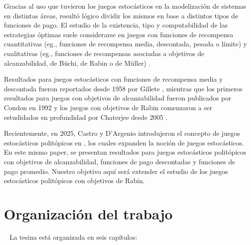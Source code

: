 
Gracias al uso que tuvieron los juegos estocásticos en la modelización de
sistemas en distintas áreas, resultó lógico dividir los mismos en base a
distintos tipos de funciones de pago. El estudio de la existencia, tipo y
computabilidad de las estrategias óptimas suele considerarse en juegos con
funciones de recompensa cuantitativas (eg., funciones de recompensa media,
descontada, pesada o límite) y cualitativas (eg., funciones de recompensas
asociadas a objetivos de alcanzabilidad, de Büchi, de Rabin o de Müller)
\cite{Chatterjee2007,Kučera2011,Chatterjee1}.

Resultados para juegos estocásticos con funciones de recompensa media y
descontada fueron reportados desde 1958 por Gillete \cite{Gillette1958},
mientras que los primeros resultados para juegos con objetivos de
alcanzabilidad fueron publicados por Condon en 1992 \cite{CONDON1992} y los
juegos con objetivos de Rabin comenzaron a ser estudidados en profundidad por
Chaterjee desde 2005 \cite{ComplexityRabin,Chatterjee2007,Chatterjee1}.

Recientemente, en 2025, Castro y D'Argenio introdujeron el concepto de juegos
estocásticos politópicos en \cite{Polytopal}, los cuales expanden la noción de
juegos estocásticos.
En este mismo paper, se presentan resultados para juegos estocásticos
politópicos con objetivos de alcanzabilidad, funciones de pago descontadas y
funciones de pago promedio. Nuestro objetivo aquí será extender el estudio de
los juegos estocásticos politópicos con objetivos de Rabin.

\section{Organización del trabajo}
~\label{cap:intro:sec:outline}
La tesina está organizada en seis capítulos:

